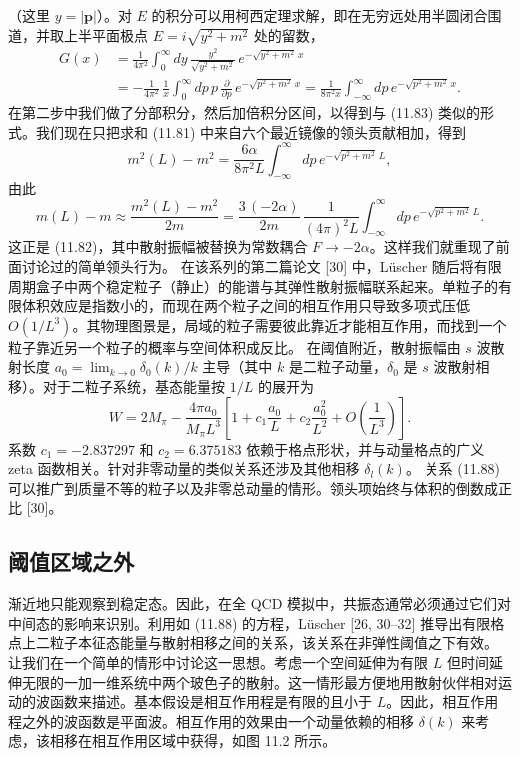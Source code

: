 （这里 $y = |\mathbf{p}|$）。对 $E$ 的积分可以用柯西定理求解，即在无穷远处用半圆闭合围道，并取上半平面极点 $E = i\sqrt{y^2 + m^2}$ 处的留数，
\begin{equation}
\begin{aligned}
G(x) &= \frac{1}{4\pi^2} \int_0^{\infty} dy\,
\frac{y^2}{\sqrt{y^2 + m^2}}\, e^{-\sqrt{y^2 + m^2}\, x} \\
&= -\frac{1}{4\pi^2}\,\frac{1}{x} \int_0^{\infty} dp\, p\,
\frac{\partial}{\partial p}\, e^{-\sqrt{p^2 + m^2}\, x}
= \frac{1}{8\pi^2 x} \int_{-\infty}^{\infty} dp\, e^{-\sqrt{p^2 + m^2}\, x} .
\end{aligned}
\end{equation}
在第二步中我们做了分部积分，然后加倍积分区间，以得到与 (11.83) 类似的形式。我们现在只把求和 (11.81) 中来自六个最近镜像的领头贡献相加，得到
\begin{equation}
m^2(L) - m^2 = \frac{6\alpha}{8\pi^2 L}
\int_{-\infty}^{\infty} dp\, e^{-\sqrt{p^2 + m^2}\, L} ,
\end{equation}
由此
\begin{equation}
m(L) - m \approx \frac{m^2(L) - m^2}{2m}
= \frac{3\,(-2\alpha)}{2m}\,
\frac{1}{(4\pi)^2 L}
\int_{-\infty}^{\infty} dp\, e^{-\sqrt{p^2 + m^2}\, L} .
\end{equation}
这正是 (11.82)，其中散射振幅被替换为常数耦合 $F \to -2\alpha$。这样我们就重现了前面讨论过的简单领头行为。
在该系列的第二篇论文 [30] 中，Lüscher 随后将有限周期盒子中两个稳定粒子（静止）的能谱与其弹性散射振幅联系起来。单粒子的有限体积效应是指数小的，而现在两个粒子之间的相互作用只导致多项式压低 $O(1/L^3)$。其物理图景是，局域的粒子需要彼此靠近才能相互作用，而找到一个粒子靠近另一个粒子的概率与空间体积成反比。
在阈值附近，散射振幅由 $s$ 波散射长度 $a_0 = \lim_{k\to 0} \delta_0(k)/k$ 主导（其中 $k$ 是二粒子动量，$\delta_0$ 是 $s$ 波散射相移）。对于二粒子系统，基态能量按 $1/L$ 的展开为
\begin{equation}
W = 2M_\pi - \frac{4\pi a_0}{M_\pi L^3}
\left[1 + c_1\frac{a_0}{L} + c_2\frac{a_0^2}{L^2} + O\left(\frac{1}{L^3}\right)\right] .
\end{equation}
系数 $c_1 = -2.837297$ 和 $c_2 = 6.375183$ 依赖于格点形状，并与动量格点的广义 zeta 函数相关。针对非零动量的类似关系还涉及其他相移 $\delta_l(k)$。
关系 (11.88) 可以推广到质量不等的粒子以及非零总动量的情形。领头项始终与体积的倒数成正比 [30]。

\subsection{阈值区域之外}
渐近地只能观察到稳定态。因此，在全 QCD 模拟中，共振态通常必须通过它们对中间态的影响来识别。利用如 (11.88) 的方程，Lüscher [26, 30--32] 推导出有限格点上二粒子本征态能量与散射相移之间的关系，该关系在非弹性阈值之下有效。
让我们在一个简单的情形中讨论这一思想。考虑一个空间延伸为有限 $L$ 但时间延伸无限的一加一维系统中两个玻色子的散射。这一情形最方便地用散射伙伴相对运动的波函数来描述。基本假设是相互作用程是有限的且小于 $L$。因此，相互作用程之外的波函数是平面波。相互作用的效果由一个动量依赖的相移 $\delta(k)$ 来考虑，该相移在相互作用区域中获得，如图 11.2 所示。

